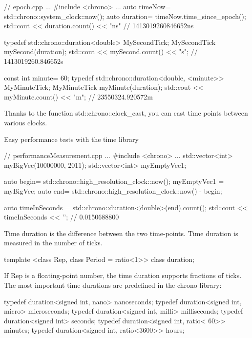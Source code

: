 
\begin{cpp}
// epoch.cpp
...
#include <chrono>
...
auto timeNow= std::chrono::system_clock::now();
auto duration= timeNow.time_since_epoch();
std::cout << duration.count() << "ns" // 1413019260846652ns

typedef std::chrono::duration<double> MySecondTick;
MySecondTick mySecond(duration);
std::cout << mySecond.count() << "s"; // 1413019260.846652s

const int minute= 60;
typedef std::chrono::duration<double, <minute>> MyMinuteTick;
MyMinuteTick myMinute(duration);
std::cout << myMinute.count() << "m"; // 23550324.920572m
\end{cpp}

Thanks to the function std::chrono::clock\_cast, you can cast time points between various clocks.

\begin{myTip}{Easy performance tests with the time library}
	

\begin{cpp}
// performanceMeasurement.cpp
...
#include <chrono>
...
std::vector<int> myBigVec(10000000, 2011);
std::vector<int> myEmptyVec1;

auto begin= std::chrono::high_resolution_clock::now();
myEmptyVec1 = myBigVec;
auto end= std::chrono::high_resolution_clock::now() - begin;

auto timeInSeconds = std::chrono::duration<double>(end).count();
std::cout << timeInSeconds << '\n'; // 0.0150688800
\end{cpp}
	
\end{myTip}



Time duration is the difference between the two time-points. Time duration is measured in the number of ticks.

\begin{cpp}
template <class Rep, class Period = ratio<1>> class duration;
\end{cpp}

If Rep is a floating-point number, the time duration supports fractions of ticks. The most important time durations are predefined in the chrono library:


\begin{cpp}
typedef duration<signed int, nano> nanoseconds;
typedef duration<signed int, micro> microseconds;
typedef duration<signed int, milli> milliseconds;
typedef duration<signed int> seconds;
typedef duration<signed int, ratio< 60>> minutes;
typedef duration<signed int, ratio<3600>> hours;
\end{cpp}


